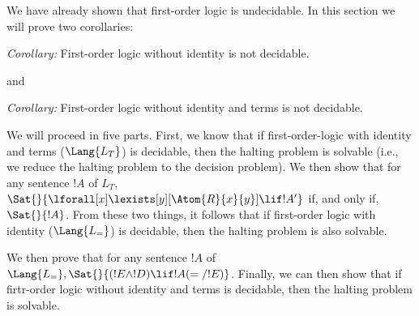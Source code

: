 \documentclass[../../../include/open-logic-section]{subfiles}
\begin{document}

\begin{explain}
We have already shown that first-order logic is undecidable. In this section we will prove two corollaries:

\emph{Corollary:} First-order logic without identity is not decidable.

and

\emph{Corollary:} First-order logic without identity and terms is not decidable.

We will proceed in five parts. First, we know that
if first-order-logic with identity and terms ($\Lang{L_T}$) is decidable,
then the halting problem is solvable (i.e., we reduce the halting problem to the
decision problem). We then show that for any sentence $!A$ of $L_T$,
$\Sat{}{\lforall[x]\lexists[y][\Atom{R}{x}{y}]\lif !A'}$ if, and only if,
$\Sat{}{!A}$. From these two things, it follows that if first-order
logic with identity ($\Lang{L_=}$) is decidable, then the halting problem
 is also solvable. 
 
 We then prove that for any sentence $!A$ of $\Lang{L_=} , 
\Sat{}{(!E \land !D) \lif !A(=/!E)}$. Finally, we can then show that if firtr-order
logic without identity and terms is decidable, then the halting problem is 
solvable.

\end{explain}
\end{document}
